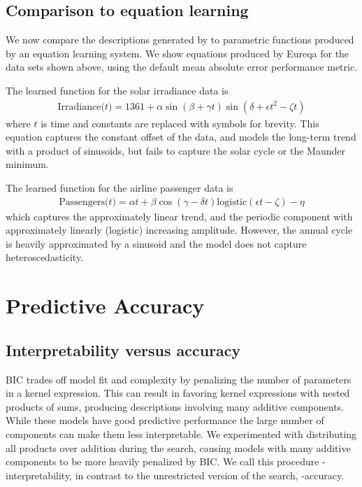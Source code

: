 \subsection{Comparison to equation learning}
\label{sec:eqn-learning-comp}

We now compare the descriptions generated by \procedurename{} to parametric functions produced by an equation learning system.
We show equations produced by Eureqa \citep{Eureqa} for the data sets shown above, using the default mean absolute error performance metric.

The learned function for the solar irradiance data is
\begin{align*}
\textrm{Irradiance($t$)} = 1361 + \alpha\sin(\beta + \gamma t)\sin(\delta + \epsilon t^2 - \zeta t)
\end{align*}
where $t$ is time and constants are replaced with symbols for brevity.
This equation captures the constant offset of the data, and models the long-term trend with a product of sinusoids, but fails to capture the solar cycle or the Maunder minimum.

The learned function for the airline passenger data is
\begin{align*}
\textrm{Passengers($t$)} = \alpha t + \beta\cos(\gamma - \delta t)\textrm{logistic}(\epsilon t - \zeta) - \eta
\end{align*}
which captures the approximately linear trend, and the periodic component with approximately linearly (logistic) increasing amplitude.
However, the annual cycle is heavily approximated by a sinusoid and the model does not capture heteroscedasticity.





\section{Predictive Accuracy}
\label{sec:numerical}


\subsection{Interpretability versus accuracy}

BIC trades off model fit and complexity by penalizing the number of parameters in a kernel expression.
This can result in \procedurename{} favoring kernel expressions with nested products of sums, producing descriptions involving many additive components.
While these models have good predictive performance the large number of components can make them less interpretable.
We experimented with distributing all products over addition during the search, causing models with many additive components to be more heavily penalized by BIC.
We call this procedure \procedurename{}-interpretability, in contrast to the unrestricted version of the search, \procedurename{}-accuracy.


